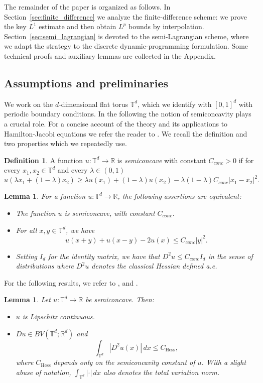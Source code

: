 \documentclass[11pt]{amsart}
\newtheorem{lemma}[thm]{Lemma}
\theoremstyle{remark}
\theoremstyle{definition}
\newtheorem{defn}[thm]{Definition}
\theoremstyle{Claim}
\newcommand{\T}{{\mathbb{T}}}
\newcommand{\R}{\mathbb{R}}
\theoremstyle{plain}
\begin{document}
The remainder of the paper is organized as follows. In Section~\ref{sec:finite_difference} we analyze the finite-difference scheme: we prove the key \(L^1\) estimate and then obtain \(L^p\) bounds by interpolation. Section~\ref{sec:semi_lagrangian} is devoted to the semi-Lagrangian scheme, where we adapt the strategy to the discrete dynamic-programming formulation. Some technical proofs and auxiliary lemmas are collected in the Appendix.

\subsection{Assumptions and preliminaries}
We work on the $d$-dimensional flat torus $\T^d$, which we identify with $[0,1]^d$ with periodic boundary conditions. 
In the following the notion of semiconcavity plays a crucial role. For a concise account of the theory and its applications to Hamilton-Jacobi equations we refer the reader to \cite{cs}. We recall the definition and two properties which we repeatedly use.

\begin{defn}
	A function \(u:\mathbb{T}^d\to\mathbb{R}\) is \emph{semiconcave} with constant \(C_{conc}>0\) if for every \(x_1,x_2\in\mathbb{T}^d\) and every \(\lambda\in(0,1)\)
	\[
	u(\lambda x_1+(1-\lambda)x_2)\ge \lambda u(x_1)+(1-\lambda)u(x_2)-\lambda(1-\lambda)C_{conc}|x_1-x_2|^2.
	\]
\end{defn}

\begin{lemma}\label{equivdefsemicon} 
	For a function $u:\T^d\to \R$, the following assertions are equivalent:
	\begin{itemize}
		\item[(i)] The function $u$ is semiconcave, with constant $C_{conc}$.
		\item[(ii)] For all $x,y\in \T^d$, we have
		$$ u(x+y)+ u(x-y) -2u(x) \leq C_{conc} |y|^{2}.$$
		\item[(iii)] Setting $I_{d}$ for the identity matrix, we have  that  $D^{2}u \leq C_{conc} I_{d}$ in the sense of distributions where $D^2 u$ denotes the classical Hessian defined a.e.
	\end{itemize}
\end{lemma}

For the following results, we refer to \cite[Thm. 2.1.7, Thm. 2.3.1, and Prop. 1.1.3 ]{cs}, and \cite{kr2}.

\begin{lemma}\label{lemma:bound_hessian} 
	Let $u:\T^d \to \R$ be semiconcave. Then: 
	\begin{itemize}
		\item[(i)] $u$ is  Lipschitz continuous.
		\item[(ii)] $Du\in BV(\T^d;\R^d)$ and
		\[
		\int_{\T^d}|D^2 u(x)|\,dx \le C_{\mathrm{Hess}},
		\]
		where $C_{\mathrm{Hess}}$ depends only on the semiconcavity constant of $u$. With a slight abuse of notation, $\int_{\T^d}|\cdot|\,dx$ also denotes the total variation norm.
	\end{itemize}
\end{lemma}
\end{document}
